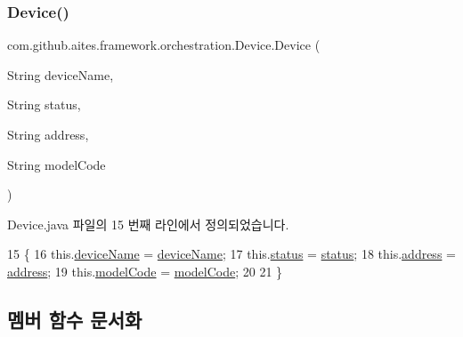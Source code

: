 \subsubsection{\texorpdfstring{Device()}{Device()}}
{\footnotesize\ttfamily com.\+github.\+aites.\+framework.\+orchestration.\+Device.\+Device (\begin{DoxyParamCaption}\item[{String}]{device\+Name,  }\item[{String}]{status,  }\item[{String}]{address,  }\item[{String}]{model\+Code }\end{DoxyParamCaption})}



Device.\+java 파일의 15 번째 라인에서 정의되었습니다.


\begin{DoxyCode}
15                                                                                      \{
16         this.\mbox{\hyperlink{classcom_1_1github_1_1aites_1_1framework_1_1orchestration_1_1_device_aa4746e20c5c8b51170b4ada37295f69e}{deviceName}} = \mbox{\hyperlink{classcom_1_1github_1_1aites_1_1framework_1_1orchestration_1_1_device_aa4746e20c5c8b51170b4ada37295f69e}{deviceName}};
17         this.\mbox{\hyperlink{classcom_1_1github_1_1aites_1_1framework_1_1orchestration_1_1_device_abe5c31f96d08c3caf2085af43d59cf6f}{status}} = \mbox{\hyperlink{classcom_1_1github_1_1aites_1_1framework_1_1orchestration_1_1_device_abe5c31f96d08c3caf2085af43d59cf6f}{status}};
18         this.\mbox{\hyperlink{classcom_1_1github_1_1aites_1_1framework_1_1orchestration_1_1_device_a81329ac5d638ae2e569595efd92a4fe4}{address}} = \mbox{\hyperlink{classcom_1_1github_1_1aites_1_1framework_1_1orchestration_1_1_device_a81329ac5d638ae2e569595efd92a4fe4}{address}};
19         this.\mbox{\hyperlink{classcom_1_1github_1_1aites_1_1framework_1_1orchestration_1_1_device_ad40a301c336d5b74572d497eff8c90eb}{modelCode}} = \mbox{\hyperlink{classcom_1_1github_1_1aites_1_1framework_1_1orchestration_1_1_device_ad40a301c336d5b74572d497eff8c90eb}{modelCode}};
20         
21     \}  \end{DoxyCode}


\subsection{멤버 함수 문서화}
\mbox{\label{classcom_1_1github_1_1aites_1_1framework_1_1orchestration_1_1_device_a46ef31f43ff94b0e890d8c65238cc5b3}} 
